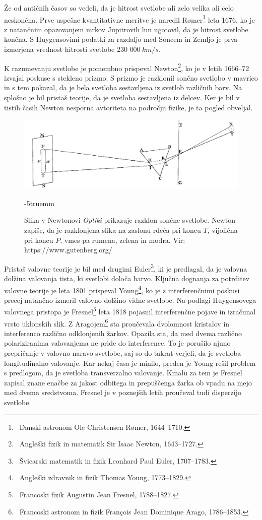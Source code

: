 Že od antičnih časov so vedeli, da
je hitrost svetlobe ali zelo velika ali celo neskončna. Prve uspešne kvantitativne
meritve je naredil R\o{}mer\footnote{~Danski astronom
Ole Christensen R\o{}mer, 1644--1710.} leta 1676, ko je z natančnim opazovanjem 
mrkov Jupitrovih lun ugotovil, da je hitrost svetlobe končna. S Huygensovimi 
podatki za razdaljo med Soncem in Zemljo je prva izmerjena vrednost hitrosti
svetlobe $230\,\,000~\si{km/s}$.

K razumevanju svetlobe je pomembno prispeval Newton\footnote{~Angleški 
fizik in matematik Sir Isaac Newton, 1643--1727.}, ko je v letih 1666--72 
izvajal poskuse s stekleno prizmo. S prizmo je razklonil sončno svetlobo v
mavrico in s tem pokazal, da je bela svetloba sestavljena 
iz svetlob različnih barv. Na splošno je bil pristaš teorije, da je 
svetloba sestavljena iz delcev. Ker je bil v tistih časih 
Newton nesporna avtoriteta na področju fizike, je ta pogled obveljal.
\begin{figure}[ht]
\centering
\includegraphics[width=10truecm]{slike/01_Newton.jpg}
\caption{Slika v Newtonovi {\it Optiki} prikazuje razklon sončne svetlobe. Newton 
zapiše, da je razklonjena slika na zaslonu rdeča pri koncu $T$, vijolična
pri koncu $P$, vmes pa rumena, zelena in modra. Vir: https://www.gutenberg.org/}
\label{fig:01_Newton}
\vglue-5truemm
\end{figure}

Pristaš valovne teorije je bil med drugimi Euler\footnote{~Švicarski 
matematik in fizik Leonhard Paul Euler, 1707--1783.}, ki je predlagal, 
da je valovna dolžina valovanja tista, ki svetlobi določa barvo.
Ključna dognanja za potrditev valovne teorije je leta 1801 prispeval 
Young\footnote{~Angleški zdravnik in fizik Thomas Young, 1773--1829.}, 
ko je z interferenčnimi poskusi precej natančno izmeril valovno dolžino 
vidne svetlobe. Na podlagi Huygensovega valovnega pristopa je 
Fresnel\footnote{~Francoski fizik Augustin Jean Fresnel, 1788--1827.}
leta 1818 pojasnil interferenčne pojave in izračunal vrsto 
uklonskih slik. Z Aragojem\footnote{~Francoski astronom in fizik
Fran\c{c}ois Jean Dominique Arago, 1786--1853.} sta proučevala 
dvolomnost kristalov in interferenco različno odklonjenih žarkov. 
Opazila sta, da med dvema različno polariziranima valovanjema ne 
pride do interference. To je porušilo njuno prepričanje v valovno 
naravo svetlobe, saj so do takrat verjeli, da je svetloba
longitudinalno valovanje. Kar nekaj časa je minilo, preden je Young 
rešil problem s predlogom, da je svetloba transverzalno valovanje.
Kmalu za tem je Fresnel zapisal znane enačbe za jakost odbitega 
in prepuščenga žarka ob vpadu na mejo med dvema sredstvoma.
Fresnel je v poznejših letih proučeval tudi disperzijo svetlobe.

